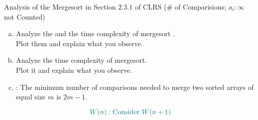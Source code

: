 
\begin{frame}{}

  \begin{columns}
  \end{columns}
\end{frame}

\begin{frame}{}
  \begin{exampleblock}{Analysis of the Mergesort in Section $2.3.1$ of CLRS (\# of Comparisions; $a_i : \infty$ not Counted)}
    \begin{enumerate}[(a)]
      \setlength{\itemsep}{5pt}
      \item Analyze the  and the  
	time complexity of mergesort . \\
	Plot them and explain what you observe.
      \item Analyze the  time complexity of mergesort. \\
	Plot it and explain what you observe.
      \item {}: 
	The minimum number of comparisons needed to merge two sorted arrays of equal size $m$ is $2m - 1$.
    \end{enumerate}
  \end{exampleblock}

  \pause
  \[
    \textcolor{teal}{W(n): \text{Consider } W(n+1)}
  \]
\end{frame}
